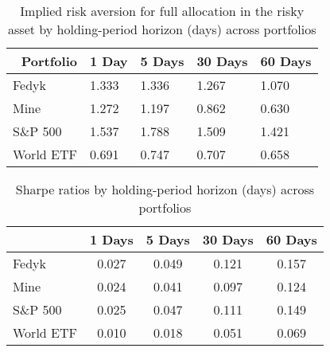 \begin{appendices}
\begin{table}[ht]
\centering
\caption{Implied risk aversion for full allocation in the risky asset by holding-period horizon (days) across portfolios}
\label{tab:gamma_alpha_1}
    \begin{tabular}{l|llll}
    \toprule
    \multicolumn{1}{r}{\textbf{Portfolio}} & \multicolumn{1}{r}{\textbf{1 Day}} & \multicolumn{1}{r}{\textbf{5 Days}} & \multicolumn{1}{r}{\textbf{30 Days}} & \multicolumn{1}{r}{\textbf{60 Days}} \\
    \midrule
    Fedyk                & 1.333                              & 1.336                               & 1.267                                & 1.070                                \\
    Mine                 & 1.272                              & 1.197                               & 0.862                                & 0.630                                \\
    S\&P 500             & 1.537                              & 1.788                               & 1.509                                & 1.421                                \\
    World ETF            & 0.691                              & 0.747                               & 0.707                                & 0.658                               
    \end{tabular}
\end{table}

\begin{table}[ht]
\centering
\caption{Sharpe ratios by holding-period horizon (days) across portfolios}
\label{tab:sharpe_ratio}
\begin{tabular}{l|c c c c}
    \toprule
    \multicolumn{1}{r}{} & \multicolumn{1}{r}{\textbf{1 Days}} & \multicolumn{1}{r}{\textbf{5 Days}} & \multicolumn{1}{r}{\textbf{30 Days}} & \multicolumn{1}{r}{\textbf{60 Days}} \\
    \midrule
    Fedyk                & 0.027                               & 0.049                               & 0.121                                & 0.157                                \\
    Mine                 & 0.024                               & 0.041                               & 0.097                                & 0.124                                \\
    S\&P 500             & 0.025                               & 0.047                               & 0.111                                & 0.149                                \\
    World ETF            & 0.010                               & 0.018                               & 0.051                                & 0.069                               
\end{tabular}
\end{table}




\end{appendices}